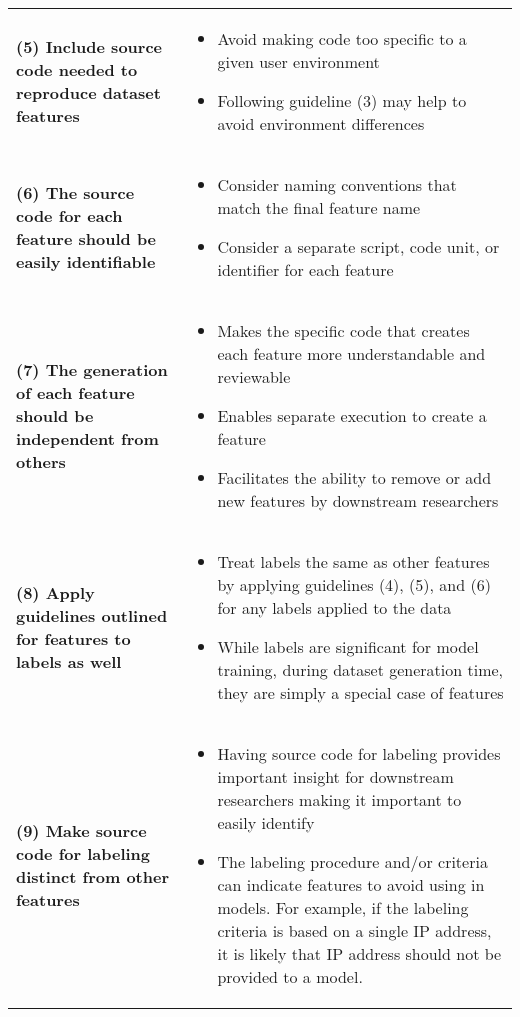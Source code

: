 \documentclass[conference]{IEEEtran}
\begin{document}
\begin{table*}
\begin{tabular}{m{8cm} m{8cm}}
    \textbf{(5) Include source code needed to reproduce dataset features} &
    \begin{itemize}
        \item Avoid making code too specific to a given user environment
        \item Following guideline (3) may help to avoid environment differences
    \end{itemize} \\

    \textbf{(6) The source code for each feature should be easily identifiable} &
    \begin{itemize}
        \item Consider naming conventions that match the final  feature name
        \item Consider a separate script, code unit, or identifier for each feature
    \end{itemize} \\

    \textbf{(7) The generation of each feature should be independent from others} &
    \begin{itemize}
        \item Makes the specific code that creates each feature more understandable and reviewable
        \item Enables separate execution to create a feature
        \item Facilitates the ability to remove or add new features by downstream researchers
    \end{itemize} \\

    \textbf{(8) Apply guidelines outlined for features to labels as well} &
    \begin{itemize}
        \item Treat labels the same as other features by applying guidelines (4), (5), and (6) for any labels applied to the data
        \item While labels are significant for model training, during dataset generation time, they are simply a special case of features
    \end{itemize} \\

    \textbf{(9) Make source code for labeling distinct from other features} &
    \begin{itemize}
        \item Having source code for labeling provides important insight for downstream researchers making it important to easily identify
        \item The labeling procedure and/or criteria can indicate features to avoid using in models.
              For example, if the labeling criteria is based on a single IP address, it is likely that IP address should not be provided to a model.
    \end{itemize} \\


\end{tabular}
\end{table*}
\end{document}
